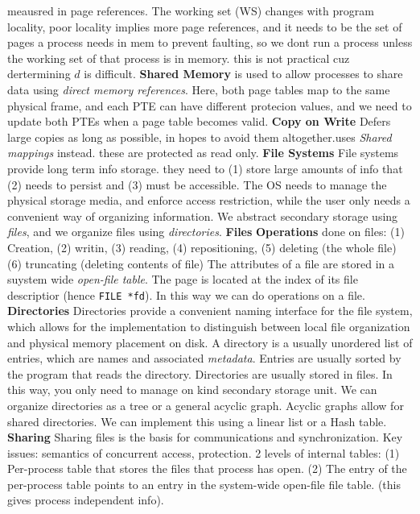 meausred in page references. The working set (WS) changes with program
locality, poor locality implies more page references, and it needs to be the
set of pages a process needs in mem to prevent faulting, so we dont run a
process unless the working set of that process is in memory. this is not
practical cuz dertermining $d$ is difficult.  {\bf Shared Memory} is used to
allow processes to share data using \emph{direct memory references}.  Here,
both page tables map to the same physical frame, and each PTE can have
different protecion values, and we need to update both PTEs when a page table
becomes valid.
{\bf Copy on Write}
Defers large copies as long as possible, in hopes to avoid them
altogether.uses   \emph{Shared mappings} instead. these are protected as read only.
{\bf File Systems}
File systems provide long term info storage. they need to (1) store large amounts of info that (2) needs to persist and (3) must be accessible.
The OS needs to manage the physical storage media, and enforce access
restriction, while the user only needs a convenient way of organizing
information.
We abstract secondary storage using \emph{files}, and we organize files
using \emph{directories}.
{\bf Files}
{\bf Operations } done on files: (1) Creation, (2) writin, (3) reading, (4) repositioning, (5) deleting (the whole file) (6) truncating (deleting contents of file)
The attributes of a file are stored in a suystem wide \emph{open-file
table}. The page is located at the index of its file descriptior (hence
\texttt{FILE\ *fd}). In this way we can do operations on a file.
{\bf Directories}
Directories provide a convenient naming interface for the file system,
which allows for the implementation to distinguish between local file
organization and physical memory placement on disk.
A directory is a usually unordered list of entries, which are names and
associated \emph{metadata}. Entries are usually sorted by the program
that reads the directory.
Directories are usually stored in files. In this way, you only need to
manage on kind secondary storage unit.
We can organize directories as a tree or a general acyclic graph.
Acyclic graphs allow for shared directories. We can implement this using
a linear list or a Hash table.
{\bf Sharing}
Sharing files is the basis for communications and synchronization.
Key issues: semantics of concurrent access, protection.
2 levels of internal tables: (1) Per-process table that stores the files that
process has open. (2) The entry of the per-process table points to an entry in
the system-wide open-file file table. (this gives process independent info).

